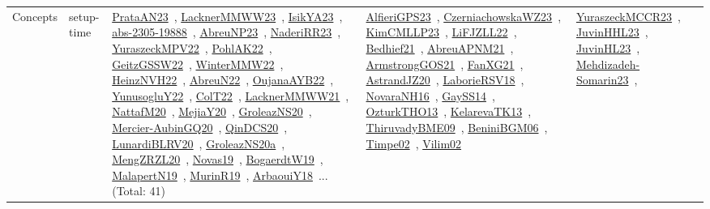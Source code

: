 {\begin{longtable}{lp{3cm}>{\raggedright\arraybackslash}p{6cm}>{\raggedright\arraybackslash}p{6cm}>{\raggedright\arraybackslash}p{8cm}}
Concepts & setup-time & \href{works/PrataAN23.pdf}{PrataAN23}~\cite{PrataAN23}, \href{works/LacknerMMWW23.pdf}{LacknerMMWW23}~\cite{LacknerMMWW23}, \href{works/IsikYA23.pdf}{IsikYA23}~\cite{IsikYA23}, \href{works/abs-2305-19888.pdf}{abs-2305-19888}~\cite{abs-2305-19888}, \href{works/AbreuNP23.pdf}{AbreuNP23}~\cite{AbreuNP23}, \href{works/NaderiRR23.pdf}{NaderiRR23}~\cite{NaderiRR23}, \href{works/YuraszeckMPV22.pdf}{YuraszeckMPV22}~\cite{YuraszeckMPV22}, \href{works/PohlAK22.pdf}{PohlAK22}~\cite{PohlAK22}, \href{works/GeitzGSSW22.pdf}{GeitzGSSW22}~\cite{GeitzGSSW22}, \href{works/WinterMMW22.pdf}{WinterMMW22}~\cite{WinterMMW22}, \href{works/HeinzNVH22.pdf}{HeinzNVH22}~\cite{HeinzNVH22}, \href{works/AbreuN22.pdf}{AbreuN22}~\cite{AbreuN22}, \href{works/OujanaAYB22.pdf}{OujanaAYB22}~\cite{OujanaAYB22}, \href{works/YunusogluY22.pdf}{YunusogluY22}~\cite{YunusogluY22}, \href{works/ColT22.pdf}{ColT22}~\cite{ColT22}, \href{works/LacknerMMWW21.pdf}{LacknerMMWW21}~\cite{LacknerMMWW21}, \href{works/NattafM20.pdf}{NattafM20}~\cite{NattafM20}, \href{works/MejiaY20.pdf}{MejiaY20}~\cite{MejiaY20}, \href{works/GroleazNS20.pdf}{GroleazNS20}~\cite{GroleazNS20}, \href{works/Mercier-AubinGQ20.pdf}{Mercier-AubinGQ20}~\cite{Mercier-AubinGQ20}, \href{works/QinDCS20.pdf}{QinDCS20}~\cite{QinDCS20}, \href{works/LunardiBLRV20.pdf}{LunardiBLRV20}~\cite{LunardiBLRV20}, \href{works/GroleazNS20a.pdf}{GroleazNS20a}~\cite{GroleazNS20a}, \href{works/MengZRZL20.pdf}{MengZRZL20}~\cite{MengZRZL20}, \href{works/Novas19.pdf}{Novas19}~\cite{Novas19}, \href{works/BogaerdtW19.pdf}{BogaerdtW19}~\cite{BogaerdtW19}, \href{works/MalapertN19.pdf}{MalapertN19}~\cite{MalapertN19}, \href{works/MurinR19.pdf}{MurinR19}~\cite{MurinR19}, \href{works/ArbaouiY18.pdf}{ArbaouiY18}~\cite{ArbaouiY18}... (Total: 41) & \href{works/AlfieriGPS23.pdf}{AlfieriGPS23}~\cite{AlfieriGPS23}, \href{works/CzerniachowskaWZ23.pdf}{CzerniachowskaWZ23}~\cite{CzerniachowskaWZ23}, \href{works/KimCMLLP23.pdf}{KimCMLLP23}~\cite{KimCMLLP23}, \href{works/LiFJZLL22.pdf}{LiFJZLL22}~\cite{LiFJZLL22}, \href{works/Bedhief21.pdf}{Bedhief21}~\cite{Bedhief21}, \href{works/AbreuAPNM21.pdf}{AbreuAPNM21}~\cite{AbreuAPNM21}, \href{works/ArmstrongGOS21.pdf}{ArmstrongGOS21}~\cite{ArmstrongGOS21}, \href{works/FanXG21.pdf}{FanXG21}~\cite{FanXG21}, \href{works/AstrandJZ20.pdf}{AstrandJZ20}~\cite{AstrandJZ20}, \href{works/LaborieRSV18.pdf}{LaborieRSV18}~\cite{LaborieRSV18}, \href{works/NovaraNH16.pdf}{NovaraNH16}~\cite{NovaraNH16}, \href{works/GaySS14.pdf}{GaySS14}~\cite{GaySS14}, \href{works/OzturkTHO13.pdf}{OzturkTHO13}~\cite{OzturkTHO13}, \href{works/KelarevaTK13.pdf}{KelarevaTK13}~\cite{KelarevaTK13}, \href{works/ThiruvadyBME09.pdf}{ThiruvadyBME09}~\cite{ThiruvadyBME09}, \href{works/BeniniBGM06.pdf}{BeniniBGM06}~\cite{BeniniBGM06}, \href{works/Timpe02.pdf}{Timpe02}~\cite{Timpe02}, \href{works/Vilim02.pdf}{Vilim02}~\cite{Vilim02} & \href{works/YuraszeckMCCR23.pdf}{YuraszeckMCCR23}~\cite{YuraszeckMCCR23}, \href{works/JuvinHHL23.pdf}{JuvinHHL23}~\cite{JuvinHHL23}, \href{works/JuvinHL23.pdf}{JuvinHL23}~\cite{JuvinHL23}, \href{works/Mehdizadeh-Somarin23.pdf}{Mehdizadeh-Somarin23}~\cite{Mehdizadeh-Somarin23}, 
\end{longtable}}
